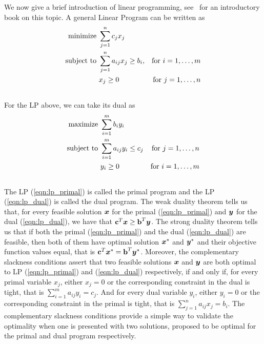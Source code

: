 \documentclass[oneside,final]{ucr}
\begin{document}
We now give a brief introduction of linear programming,
see~\cite{Chvatal83} for an introductory book on this topic.
A general Linear Program can be written as
\begin{align}
  \label{eqn:lp_primal}
  \text{minimize } & \sum_{j=1}^n c_j x_j & \\ \notag
  \text{subject to } & \sum_{j=1}^n a_{ij} x_j \geq b_i,
   & \text{for } i = 1, \ldots, m\\ \notag
   & x_j \geq 0 & \text{for } j = 1, \ldots, n\\ \notag
\end{align}
For the LP above, we can take its dual as
\begin{align}
  \label{eqn:lp_dual}
  \text{maximize } & \sum_{i=1}^m b_i y_i &\\ \notag
  \text{subject to } & \sum_{i=1}^m a_{ij} y_i \leq c_j
   & \text{for } j = 1, \ldots, n\\ \notag
   & y_i \geq 0 & \text{for } i = 1,\ldots,m\\ \notag
\end{align}
The LP (\ref{eqn:lp_primal}) is called the primal program
and the LP (\ref{eqn:lp_dual}) is called the dual program.
The weak duality theorem tells us that, for every feasible
solution $\boldsymbol{x}$ for the primal (\ref{eqn:lp_primal}) and
$\boldsymbol{y}$ for the dual (\ref{eqn:lp_dual}), we have that
$\textbf{c}^T \boldsymbol{x} \geq \textbf{b}^T \boldsymbol{y}$. The strong
duality theorem tells us that if both the primal
(\ref{eqn:lp_primal}) and the dual (\ref{eqn:lp_dual}) are
feasible, then both of them have optimal solution
$\boldsymbol{x}^\ast$ and $\boldsymbol{y}^\ast$ and their objective function
values equal, that is $\textbf{c}^T \boldsymbol{x}^\ast = \textbf{b}^T
\boldsymbol{y}^\ast$. Moreover, the complementary slackness conditions
assert that two feasible solutions $\boldsymbol{x}$ and $\boldsymbol{y}$ are
both optimal to LP (\ref{eqn:lp_primal}) and
(\ref{eqn:lp_dual}) respectively, if and only if, for every
primal variable $x_j$, either $x_j = 0$ or the corresponding
constraint in the dual is tight, that is $\sum_{i=1}^m
a_{ij} y_i = c_j$. And for every dual variable $y_i$, either
$y_i = 0$ or the corresponding constraint in the primal is
tight, that is $\sum_{j=1}^n a_{ij} x_j = b_i$. The
complementary slackness conditions provide a simple way to
validate the optimality when one is presented with two
solutions, proposed to be optimal for the primal and dual
program respectively.
\end{document}
